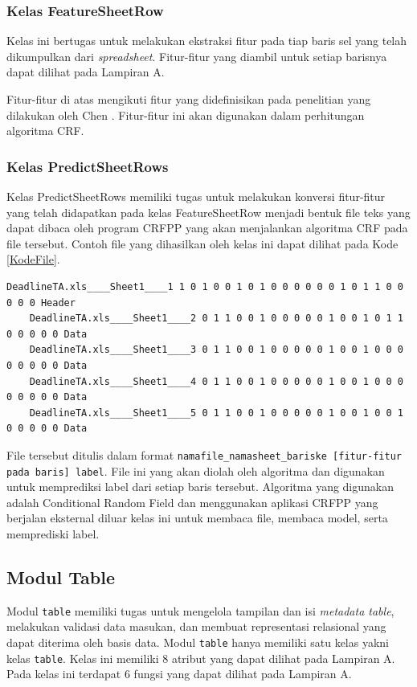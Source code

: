 \subsubsection{Kelas FeatureSheetRow}
Kelas ini bertugas untuk melakukan ekstraksi fitur pada tiap baris sel yang telah dikumpulkan dari \textit{spreadsheet}. Fitur-fitur yang diambil untuk setiap barisnya dapat dilihat pada Lampiran A.

Fitur-fitur di atas mengikuti fitur yang didefinisikan pada penelitian yang dilakukan oleh Chen \citep{Chen2013}. Fitur-fitur ini akan digunakan dalam perhitungan algoritma CRF.

\subsubsection{Kelas PredictSheetRows}
Kelas PredictSheetRows memiliki tugas untuk melakukan konversi fitur-fitur yang telah didapatkan pada kelas FeatureSheetRow menjadi bentuk file teks yang dapat dibaca oleh program CRFPP yang akan menjalankan algoritma CRF pada file tersebut. Contoh file yang dihasilkan oleh kelas ini dapat dilihat pada Kode \ref{KodeFile}.\\

\begin{lstlisting}[frame=single, basicstyle=\linespread{1}\scriptsize\listingsfont, captionpos=b, caption={File Berisikan Fitur Tiap Baris}, label=KodeFile]
	DeadlineTA.xls____Sheet1____1 1 0 1 0 0 1 0 1 0 0 0 0 0 0 1 0 1 1 0 0 0 0 0 Header
	DeadlineTA.xls____Sheet1____2 0 1 1 0 0 1 0 0 0 0 0 1 0 0 1 0 1 1 0 0 0 0 0 Data
	DeadlineTA.xls____Sheet1____3 0 1 1 0 0 1 0 0 0 0 0 1 0 0 1 0 0 0 0 0 0 0 0 Data
	DeadlineTA.xls____Sheet1____4 0 1 1 0 0 1 0 0 0 0 0 1 0 0 1 0 0 0 0 0 0 0 0 Data
	DeadlineTA.xls____Sheet1____5 0 1 1 0 0 1 0 0 0 0 0 1 0 0 1 0 0 1 0 0 0 0 0 Data
	\end{lstlisting}

File tersebut ditulis dalam format \texttt{namafile\_namasheet\_bariske [fitur-fitur pada baris] label}. File ini yang akan diolah oleh algoritma dan digunakan untuk memprediksi label dari setiap baris tersebut. Algoritma yang digunakan adalah Conditional Random Field dan menggunakan aplikasi CRFPP yang berjalan eksternal diluar kelas ini untuk membaca file, membaca model, serta memprediski label.

\subsection{Modul Table}
Modul \texttt{table} memiliki tugas untuk mengelola tampilan dan isi \textit{metadata table}, melakukan validasi data masukan, dan membuat representasi relasional yang dapat diterima oleh basis data. Modul \texttt{table} hanya memiliki satu kelas yakni kelas \texttt{table}. Kelas ini memiliki 8 atribut yang dapat dilihat pada Lampiran A.	Pada kelas ini terdapat 6 fungsi yang dapat dilihat pada Lampiran A.

